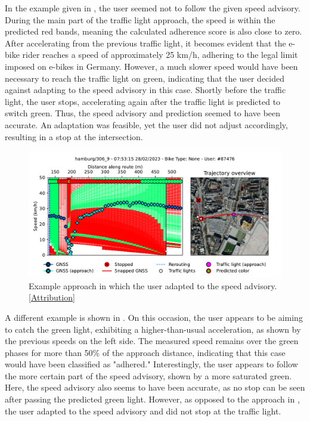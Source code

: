 In the example given in , the user seemed not to follow the given speed advisory. During the main part of the traffic light approach, the speed is within the predicted red bands, meaning the calculated adherence score is also close to zero. After accelerating from the previous traffic light, it becomes evident that the e-bike rider reaches a speed of approximately 25 km/h, adhering to the legal limit imposed on e-bikes in Germany. However, a much slower speed would have been necessary to reach the traffic light on green, indicating that the user decided against adapting to the speed advisory in this case. Shortly before the traffic light, the user stops, accelerating again after the traffic light is predicted to switch green. Thus, the speed advisory and prediction seemed to have been accurate. An adaptation was feasible, yet the user did not adjust accordingly, resulting in a stop at the intersection.

\begin{figure}[t]
\caption{Example approach in which the user adapted to the speed advisory. [\hyperref[attribution]{Attribution}]}\label{fig:example-trajectory-adapted}
\includegraphics[width=\linewidth]{images/example-trajectory-adapted.pdf}
\end{figure}

A different example is shown in . On this occasion, the user appears to be aiming to catch the green light, exhibiting a higher-than-usual acceleration, as shown by the previous speeds on the left side. The measured speed remains over the green phases for more than 50\% of the approach distance, indicating that this case would have been classified as "adhered." Interestingly, the user appears to follow the more certain part of the speed advisory, shown by a more saturated green. Here, the speed advisory also seems to have been accurate, as no stop can be seen after passing the predicted green light. However, as opposed to the approach in , the user adapted to the speed advisory and did not stop at the traffic light.

